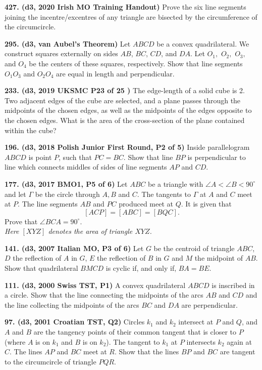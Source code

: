 \documentclass{article}
\begin{document}
\textbf{427. (\color{red}d3\color{black}, 2020 Irish MO Training Handout)} Prove the six line segments joining the incentre/excentres of any triangle are bisected by the circumference of the circumcircle.

\textbf{295. (\color{red}d3\color{black}, van Aubel's Theorem)} Let $ABCD$ be a convex quadrilateral. We construct squares externally on sides $AB$, $BC$, $CD$, and $DA$. Let $O_1,$ $O_2,$ $O_3,$ and $O_4$ be the centers of these squares, respectively. Show that line segments $O_1 O_3$ and $O_2 O_4$ are equal in length and perpendicular.

\textbf{233. (\color{red}d3\color{black}, 2019 UKSMC P23 of 25  )} The edge-length of a solid cube is 2. Two adjacent edges of the cube are selected, and a plane passes through the midpoints of the chosen edges, as well as the midpoints of the edges opposite to the chosen edges. What is the area of the cross-section of the plane contained within the cube?

\textbf{196. (\color{red}d3\color{black}, 2018 Polish Junior First Round, P2 of 5)} Inside parallelogram $ABCD$ is point $P$, such that $PC = BC$. Show that line $BP$ is perpendicular to line which connects middles of sides of line segments $AP$ and $CD$.

\textbf{177. (\color{red}d3\color{black}, 2017 BMO1, P5 of 6)} Let \(ABC\) be a triangle with \(\angle A < \angle B < 90^{\circ}\) and let \(\Gamma\) be the circle through \(A, B\) and \(C\). The tangents to \(\Gamma\) at \(A\) and \(C\) meet at \(P\). The line segments \(AB\) and \(PC\) produced meet at \(Q\). It is given that \[[ACP] = [ABC] = [BQC].\] Prove that \(\angle BCA = 90^{\circ}\).\\ \textit{Here \([XYZ]\) denotes the area of triangle \(XYZ\).}

\textbf{141. (\color{red}d3\color{black}, 2007 Italian MO, P3 of 6)} Let \(G\) be the centroid of triangle \(ABC\), \(D\) the reflection of \(A\) in \(G\), \(E\) the reflection of \(B\) in \(G\) and \(M\) the midpoint of \(AB\). Show that quadrilateral \(BMCD\) is cyclic if, and only if, \(BA = BE\).

\textbf{111. (\color{red}d3\color{black}, 2000 Swiss TST, P1)} A convex quadrilateral \(ABCD\) is inscribed in a circle. Show that the line connecting the midpoints of the arcs \(AB\) and \(CD\) and the line collecting the midpoints of the arcs \(BC\) and \(DA\) are perpendicular.

\textbf{97. (\color{red}d3\color{black}, 2001 Croatian TST, Q2)} Circles \(k_1\) and \(k_2\) intersect at \(P\) and \(Q\), and \(A\) and \(B\) are the tangency points of their common tangent that is closer to \(P\) (where \(A\) is on \(k_1\) and \(B\) is on \(k_2\)). The tangent to \(k_1\) at \(P\) intersects \(k_2\) again at \(C\). The lines \(AP\) and \(BC\) meet at \(R\). Show that the lines \(BP\) and \(BC\) are tangent to the circumcircle of triangle \(PQR\).
\end{document}
